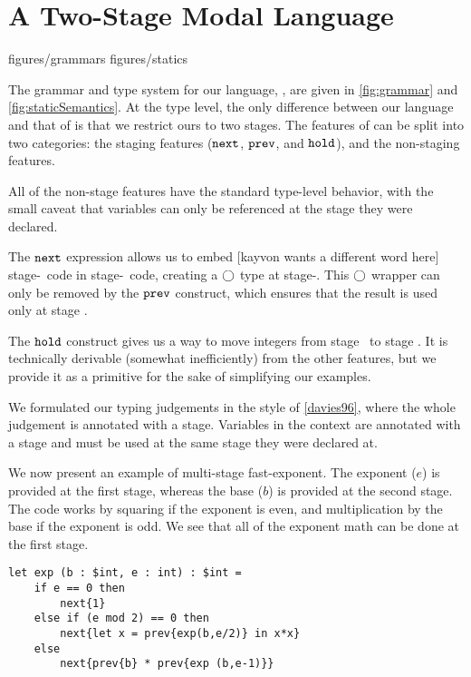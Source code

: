 

\section{A Two-Stage Modal Language}

 {figures/grammars}
 {figures/statics}

The grammar and type system for our language, \lang, are given in \ref{fig:grammar} and \ref{fig:staticSemantics}.
At the type level, the only difference between our language and that of \cite{davies96} is that we restrict ours to two stages.
The features of \lang can be split into two categories: the staging features (${\tt next}$, ${\tt prev}$, and ${\tt hold}$), and the non-staging features.

All of the non-stage features have the standard type-level behavior, 
with the small caveat that variables can only be referenced at the stage they were declared.

The ${\tt next}$ expression allows us to embed [kayvon wants a different word here] stage-\bbtwo~code in stage-\bbone~code, 
creating a $\bigcirc$ type at stage-\bbone.  
This $\bigcirc$ wrapper can only be removed by the ${\tt prev}$ construct, which ensures that the result is used only at stage \bbtwo.

The ${\tt hold}$ construct gives us a way to move integers from stage \bbone~to stage \bbtwo.  
It is technically derivable (somewhat inefficiently) from the other features, 
but we provide it as a primitive for the sake of simplifying our examples.

We formulated our typing judgements in the style of \ref{davies96}, where the whole judgement is annotated with a stage.  
Variables in the context are annotated with a stage and must be used at the same stage they were declared at.

We now present an example of multi-stage fast-exponent.  
The exponent ($e$) is provided at the first stage, whereas the base ($b$) is provided at the second stage.
The code works by squaring if the exponent is even, and multiplication by the base if the exponent is odd.
We see that all of the exponent math can be done at the first stage.

\begin{lstlisting} 
let exp (b : $int, e : int) : $int =
	if e == 0 then
		next{1}
	else if (e mod 2) == 0 then
		next{let x = prev{exp(b,e/2)} in x*x}
	else
		next{prev{b} * prev{exp (b,e-1)}}		
\end{lstlisting}

